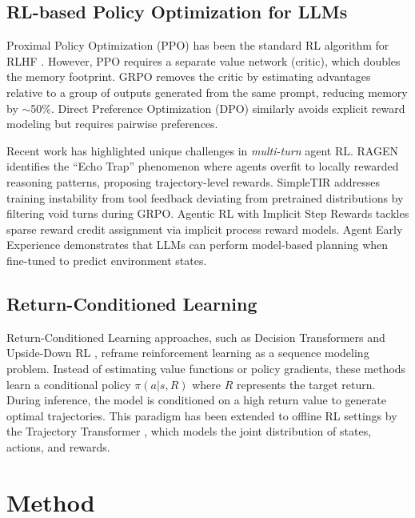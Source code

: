 \documentclass{article}
\theoremstyle{plain}
\theoremstyle{definition}
\theoremstyle{remark}
\begin{document}
\subsection{RL-based Policy Optimization for LLMs}
Proximal Policy Optimization (PPO) \cite{schulman2017proximal} has been the standard RL algorithm for RLHF \cite{ouyang2022training,stiennon2020learning}. However, PPO requires a separate value network (critic), which doubles the memory footprint. GRPO \cite{deepseek2025r1} removes the critic by estimating advantages relative to a group of outputs generated from the same prompt, reducing memory by $\sim$50\%. Direct Preference Optimization (DPO) \cite{rafailov2023direct} similarly avoids explicit reward modeling but requires pairwise preferences.

Recent work has highlighted unique challenges in \emph{multi-turn} agent RL. RAGEN \cite{wang2025ragen} identifies the ``Echo Trap'' phenomenon where agents overfit to locally rewarded reasoning patterns, proposing trajectory-level rewards. SimpleTIR \cite{wang2025simpletir} addresses training instability from tool feedback deviating from pretrained distributions by filtering void turns during GRPO. Agentic RL with Implicit Step Rewards \cite{putta2025agentic} tackles sparse reward credit assignment via implicit process reward models. Agent Early Experience \cite{zhang2024agent} demonstrates that LLMs can perform model-based planning when fine-tuned to predict environment states.

\subsection{Return-Conditioned Learning}
Return-Conditioned Learning approaches, such as Decision Transformers \cite{chen2021decision} and Upside-Down RL \cite{schmidhuber2019reinforcement}, reframe reinforcement learning as a sequence modeling problem. Instead of estimating value functions or policy gradients, these methods learn a conditional policy $\pi(a|s, R)$ where $R$ represents the target return. During inference, the model is conditioned on a high return value to generate optimal trajectories. This paradigm has been extended to offline RL settings by the Trajectory Transformer \cite{janner2021offline}, which models the joint distribution of states, actions, and rewards. 


\section{Method}
\label{sec:method}
\end{document}
